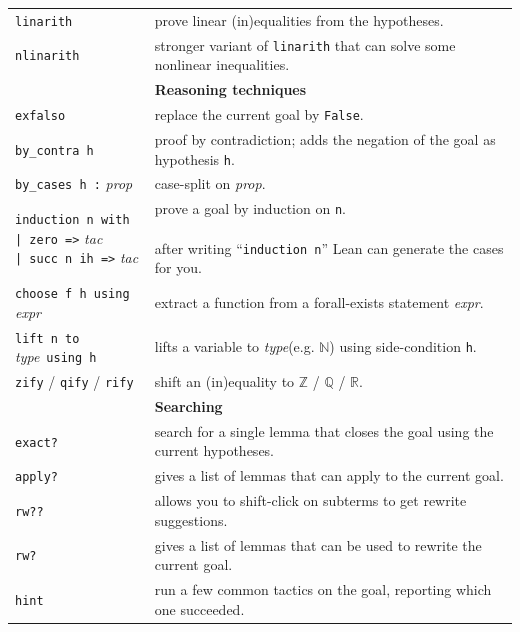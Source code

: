 \documentclass[a4paper]{article}
\newcommand{\lean}[1]{{\tt #1}}
\newcommand{\expr}[1][]{\textit{expr#1}\xspace}
\newcommand{\proposition}{\textit{prop}\xspace}
\newcommand{\tactic}[1][]{\textit{tac#1}\xspace} %
\newcommand{\type}{\textit{type}\xspace}
\newcommand{\light}{\faLightbulbO\xspace}
\begin{document}
\begin{center}
\begin{longtable}{@{}lp{113mm}@{}}
  \lean{linarith} & prove linear (in)equalities from the hypotheses. \\
  \lean{nlinarith} & stronger variant of \lean{linarith} that can solve some nonlinear inequalities. \\
  \hline
  &\textbf{Reasoning techniques}\\
  \lean{exfalso} & replace the current goal by \lean{False}. \\
  \lean{by\_contra h} & proof by contradiction; adds the negation of the goal as hypothesis \lean{h}.\\
  \lean{by\_cases h :} \proposition & case-split on \proposition. \\
  \makecell[lt]{\lean{induction n with }\\ \lean{| zero      =>} \tactic \\ \lean{| succ n ih =>} \tactic} &
  \makecell[lt]{prove a goal by induction on \lean{n}.\\ \\ \light after writing ``\lean{induction n}'' Lean can generate the cases for you.} \\
  \lean{choose f h using} \expr & extract a function from a forall-exists statement \expr.\\
  \lean{lift n to} \type\ \lean{using h} & lifts a variable to \type (e.g. $\mathbb{N}$) using side-condition \lean{h}.\\
  \lean{zify} / \lean{qify} / \lean{rify} & shift an (in)equality to $\mathbb{Z}$ / $\mathbb{Q}$ / $\mathbb{R}$. \\
  \hline
  &\textbf{Searching}\\
  \lean{exact?} & search for a single lemma that closes the goal using the current hypotheses. \\
  \lean{apply?} & gives a list of lemmas that can apply to the current goal. \\
  \lean{rw??} & allows you to shift-click on subterms to get rewrite suggestions. \\
  \lean{rw?} & gives a list of lemmas that can be used to rewrite the current goal. \\
  \lean{hint} & run a few common tactics on the goal, reporting which one succeeded. \\

\end{longtable}
\end{center}
\end{document}
